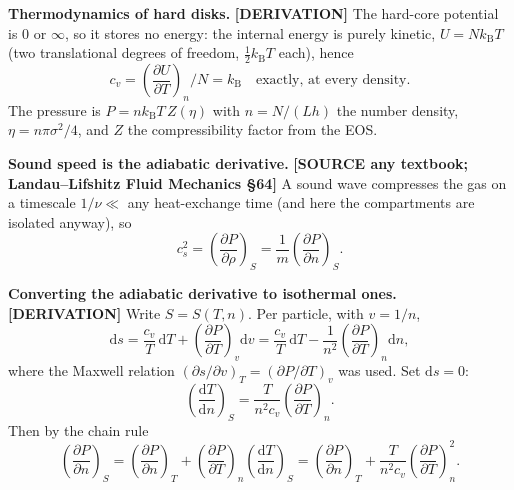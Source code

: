 \documentclass[11pt,a4paper]{article}
\newcommand{\kT}{k_{\mathrm B}T}
\newcommand{\dd}{\mathrm{d}}
\newcommand{\src}[1]{\textcolor{OliveGreen}{\textbf{[SOURCE #1]}}}
\newcommand{\der}{\textcolor{NavyBlue}{\textbf{[DERIVATION]}}}
\begin{document}
\textbf{Thermodynamics of hard disks.} \der{} The hard-core potential is $0$ or $\infty$, so it stores no energy: the internal energy is purely kinetic, $U = N\kT$ (two translational degrees of freedom, $\tfrac12\kT$ each), hence
\begin{equation}
c_v = \left(\frac{\partial U}{\partial T}\right)_{\!n}\Big/N = k_{\mathrm B} \quad\text{exactly, at every density.}
\label{eq:cv}
\end{equation}
The pressure is $P = n\kT\,Z(\eta)$ with $n = N/(Lh)$ the number density, $\eta = n\pi\sigma^2/4$, and $Z$ the compressibility factor from the EOS.

\textbf{Sound speed is the adiabatic derivative.} \src{any textbook; Landau--Lifshitz Fluid Mechanics \S64} A sound wave compresses the gas on a timescale $1/\nu \ll$ any heat-exchange time (and here the compartments are isolated anyway), so
\begin{equation}
c_s^2 = \left(\frac{\partial P}{\partial \rho}\right)_{\!S} = \frac{1}{m}\left(\frac{\partial P}{\partial n}\right)_{\!S}.
\label{eq:csdef}
\end{equation}

\textbf{Converting the adiabatic derivative to isothermal ones.} \der{} Write $S = S(T,n)$. Per particle, with $v = 1/n$,
\begin{equation}
\dd s = \frac{c_v}{T}\,\dd T + \left(\frac{\partial P}{\partial T}\right)_{\!v}\dd v
= \frac{c_v}{T}\,\dd T - \frac{1}{n^2}\left(\frac{\partial P}{\partial T}\right)_{\!n}\dd n,
\end{equation}
where the Maxwell relation $(\partial s/\partial v)_T = (\partial P/\partial T)_v$ was used. Set $\dd s = 0$:
\begin{equation}
\left(\frac{\dd T}{\dd n}\right)_{\!S} = \frac{T}{n^2 c_v}\left(\frac{\partial P}{\partial T}\right)_{\!n}.
\end{equation}
Then by the chain rule
\begin{equation}
\left(\frac{\partial P}{\partial n}\right)_{\!S}
= \left(\frac{\partial P}{\partial n}\right)_{\!T}
+ \left(\frac{\partial P}{\partial T}\right)_{\!n}\left(\frac{\dd T}{\dd n}\right)_{\!S}
= \left(\frac{\partial P}{\partial n}\right)_{\!T}
+ \frac{T}{n^2 c_v}\left(\frac{\partial P}{\partial T}\right)_{\!n}^{2}.
\label{eq:adiab}
\end{equation}
\end{document}
